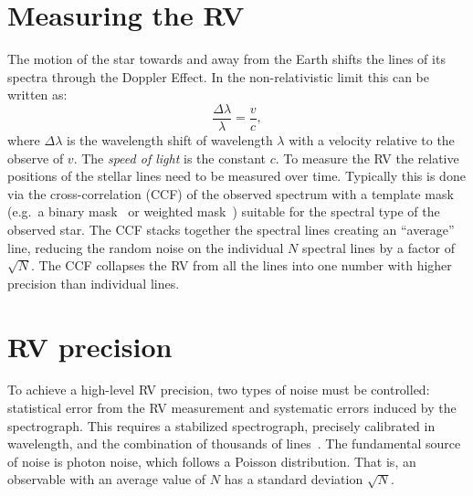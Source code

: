 
\section{Measuring the {RV}}
\label{sec:measuring_rv}
The motion of the star towards and away from the Earth shifts the lines of its spectra through the Doppler Effect.
In the non-relativistic limit this can be written as:
\begin{equation}
\frac{\Delta\lambda}{\lambda} = \frac{v}{c},
\end{equation}
where $\Delta\lambda$ is the wavelength shift of wavelength $\lambda$ with a velocity relative to the observe of \(v\).
The \emph{speed of light} is the constant $c$.
To measure the {RV} the relative positions of the stellar lines need to be measured over time.
Typically this is done via the cross-correlation ({CCF}) of the observed spectrum with a template mask (e.g.\ a binary mask~\citep{baranne_elodie_1996} or weighted mask~\citep{pepe_coralie_2002}) suitable for the spectral type of the observed star.
The {CCF} stacks together the spectral lines creating an ``average'' line, reducing the random noise on the individual $N$ spectral lines by a factor of $\sqrt{N}$.
The {CCF} collapses the {RV} from all the lines into one number with higher precision than individual lines.


\section{{RV} precision}
\label{sec:rv_precision}
To achieve a high-level {RV} precision, two types of noise must be controlled: statistical error from the {RV} measurement and systematic errors induced by the spectrograph.
This requires a stabilized spectrograph, precisely calibrated in wavelength, and the combination of thousands of lines~\citep[e.g.][]{pepe_instrumentation_2014}.
The fundamental source of noise is photon noise, which follows a {Poisson} distribution.
That is, an observable with an average value of $N$ has a standard deviation $\sqrt{N}$.


